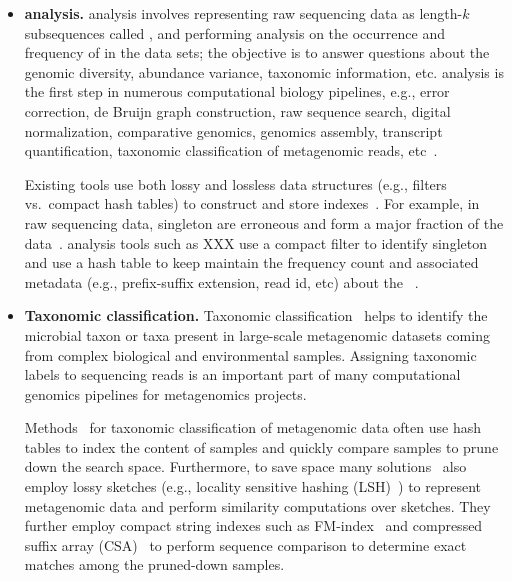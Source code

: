 \begin{itemize}[leftmargin=*]
    
\item {\bf \Kmer analysis.}  
\Kmer analysis involves representing raw sequencing data as length-$k$ subsequences called \kmers, and performing analysis on the occurrence and frequency of \kmers in the data sets; the objective is to answer questions about the genomic diversity, abundance variance, taxonomic information, etc.
\Kmer analysis is the first step in numerous computational biology pipelines, e.g., error correction, de Bruijn graph construction, raw sequence search, digital normalization, comparative genomics, genomics assembly, transcript quantification, taxonomic classification of metagenomic reads, etc~\cite{xxxx}.

Existing tools use both lossy and lossless data structures (e.g., filters vs.\ compact hash tables) to construct and store \kmer indexes~\cite{xxxx}. 
For example, in raw sequencing data, singleton \kmers are erroneous and form a major fraction of the data~\cite{xxxx}. \kmer analysis tools such as  XXX use a compact filter to identify singleton \kmers and use a hash table to keep maintain the frequency count and associated metadata (e.g., prefix-suffix extension, read id, etc) about the \kmers~\cite{xxxx}.

\item {\bf Taxonomic classification.} Taxonomic classification~\cite{something} helps to identify the microbial taxon or taxa present in large-scale  metagenomic datasets coming from complex biological and environmental samples. Assigning taxonomic labels to sequencing reads is an important part of many computational genomics pipelines for metagenomics
projects. 

Methods~\cite{cite-something} for taxonomic classification of metagenomic data often use hash tables to index the \kmer content of samples and quickly compare samples to prune down the search space.
Furthermore, to save space many solutions~\cite{cite-something} also employ lossy sketches (e.g., locality sensitive hashing (LSH)~\cite{cite-something}) to represent metagenomic data and perform similarity computations over sketches.
They further employ compact string indexes such as FM-index~\cite{fm-index} and compressed suffix array (CSA)~\cite{csa} to perform sequence comparison to determine exact matches among the pruned-down samples.


\end{itemize}
